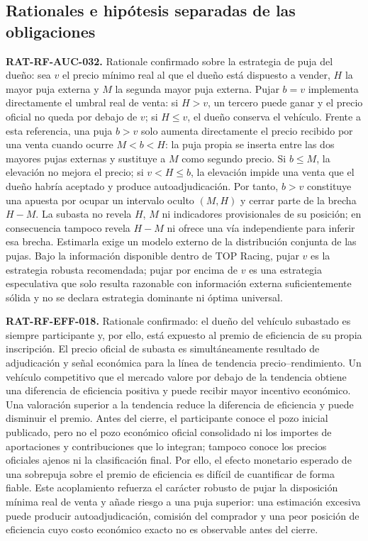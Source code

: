 \documentclass[10pt,letterpaper]{article}
\begin{document}
\subsection{Rationales e hipótesis separadas de las obligaciones}

\noindent\textbf{RAT-RF-AUC-032.} Rationale confirmado sobre la estrategia de puja del dueño: sea $v$ el precio mínimo real al que el dueño está dispuesto a vender, $H$ la mayor puja externa y $M$ la segunda mayor puja externa. Pujar $b=v$ implementa directamente el umbral real de venta: si $H>v$, un tercero puede ganar y el precio oficial no queda por debajo de $v$; si $H\leq v$, el dueño conserva el vehículo. Frente a esta referencia, una puja $b>v$ solo aumenta directamente el precio recibido por una venta cuando ocurre $M<b<H$: la puja propia se inserta entre las dos mayores pujas externas y sustituye a $M$ como segundo precio. Si $b\leq M$, la elevación no mejora el precio; si $v<H\leq b$, la elevación impide una venta que el dueño habría aceptado y produce autoadjudicación. Por tanto, $b>v$ constituye una apuesta por ocupar un intervalo oculto $(M,H)$ y cerrar parte de la brecha $H-M$. La subasta no revela $H$, $M$ ni indicadores provisionales de su posición; en consecuencia tampoco revela $H-M$ ni ofrece una vía independiente para inferir esa brecha. Estimarla exige un modelo externo de la distribución conjunta de las pujas. Bajo la información disponible dentro de TOP Racing, pujar $v$ es la estrategia robusta recomendada; pujar por encima de $v$ es una estrategia especulativa que solo resulta razonable con información externa suficientemente sólida y no se declara estrategia dominante ni óptima universal.\par
\noindent\textbf{RAT-RF-EFF-018.} Rationale confirmado: el dueño del vehículo subastado es siempre participante y, por ello, está expuesto al premio de eficiencia de su propia inscripción. El precio oficial de subasta es simultáneamente resultado de adjudicación y señal económica para la línea de tendencia precio--rendimiento. Un vehículo competitivo que el mercado valore por debajo de la tendencia obtiene una diferencia de eficiencia positiva y puede recibir mayor incentivo económico. Una valoración superior a la tendencia reduce la diferencia de eficiencia y puede disminuir el premio. Antes del cierre, el participante conoce el pozo inicial publicado, pero no el pozo económico oficial consolidado ni los importes de aportaciones y contribuciones que lo integran; tampoco conoce los precios oficiales ajenos ni la clasificación final. Por ello, el efecto monetario esperado de una sobrepuja sobre el premio de eficiencia es difícil de cuantificar de forma fiable. Este acoplamiento refuerza el carácter robusto de pujar la disposición mínima real de venta y añade riesgo a una puja superior: una estimación excesiva puede producir autoadjudicación, comisión del comprador y una peor posición de eficiencia cuyo costo económico exacto no es observable antes del cierre.\par
\end{document}
